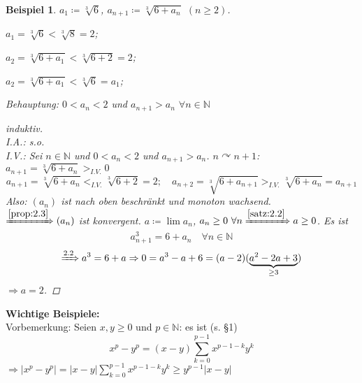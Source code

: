 \documentclass[titlepage,ngerman,a4paper,headsepline,DIV15,halfparskip*,14pt]{scrartcl}
\newcommand{\N}{\mathbb{N}}
\theoremstyle{dotless}
\newtheorem*{beispiel*}{Beispiel}
\begin{document}
\begin{beispiel*} $a_{1} \coloneqq \sqrt[3]{6}$, $a_{n + 1} \coloneqq \sqrt[3]{6 + a_{n}}$ $(n \geq 2)$.
	\begin{description}
		\item $a_{1} = \sqrt[3]{6} < \sqrt[3]{8} = 2$;
		\item $a_{2} = \sqrt[3]{6 + a_{1}} < \sqrt[3]{6 + 2} = 2$;
		\item $a_{2} = \sqrt[3]{6 + a_{1}} < \sqrt[3]{6} = a_{1}$;
	\end{description}
	Behauptung: $0 < a_{n} < 2$ und $a_{n + 1} > a_{n}$ $\forall n \in \N$

	\begin{proof}[induktiv]~\\
		I.A.: s.o. \\
		I.V.: Sei $n \in \N$ und $0 < a_{n} < 2$ und $a_{n+1} > a_{n}$. $n \curvearrowright n + 1$: $a_{n + 1} = \sqrt[3]{6 + a_{n}} >_{I.V.} 0$
		$$
			a_{n +1} = \sqrt[3]{6 + a_{n}} <_{I.V.} \sqrt[3]{6 + 2} = 2; \quad a_{n + 2} = \sqrt[3]{6 + a_{n+1}} >_{I.V.} \sqrt[3]{6 + a_{n}} = a_{n + 1}
		$$
		Also: $(a_{n})$ ist nach oben beschränkt und monoton wachsend. \\
		$\xRightarrow[]{\ref{prop:2.3}} (a_{n})$ ist konvergent. $a \coloneqq \lim a_{n}$, $a_{n} \geq 0 ~\forall n \xRightarrow[]{\ref{satz:2.2}} a \geq 0$. Es ist
		$$
			a_{n+1}^{3} = 6 + a_{n} \quad \forall n \in \N
		$$
		$$
			\xRightarrow[]{2.2} a^{3} = 6 + a \Rightarrow 0 = a^{3} - a + 6 = (a-2)(\underbrace{a^{2}-2a+3}_{\geq 3})
		$$
		$\Rightarrow a = 2$.
	\end{proof}
\end{beispiel*}


\textbf{Wichtige Beispiele:} \\

Vorbemerkung: Seien $x, y \geq 0$ und $p \in \N$: es ist (s. \S 1)
$$
	x^{p} - y^{p} = (x - y) \sum_{k = 0}^{p-1} x^{p-1-k}y^{k}
$$
$\Rightarrow |x^{p} - y^{p}| = |x-y| \sum_{k=0}^{p-1} x^{p-1-k}y^{k} \geq y^{p-1} |x - y|$
\newline
\end{document}
